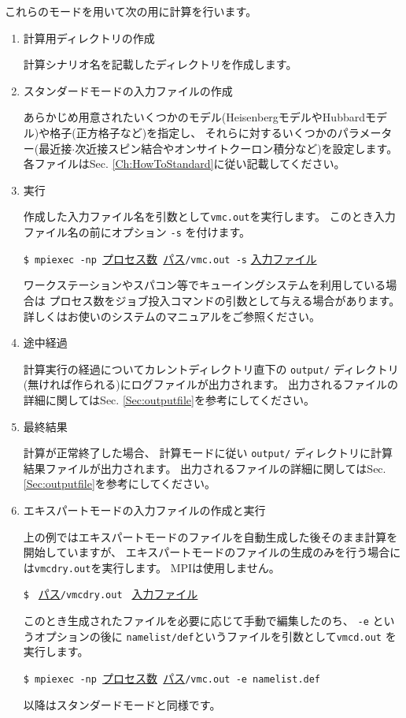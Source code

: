 これらのモードを用いて次の用に計算を行います。

\begin{enumerate}
  
\item  計算用ディレクトリの作成

  計算シナリオ名を記載したディレクトリを作成します。

\item  スタンダードモードの入力ファイルの作成

  あらかじめ用意されたいくつかのモデル(HeisenbergモデルやHubbardモデル)や格子(正方格子など)を指定し、
  それらに対するいくつかのパラメーター(最近接$\cdot$次近接スピン結合やオンサイトクーロン積分など)を設定します。
  各ファイルはSec. \ref{Ch:HowToStandard}に従い記載してください。

\item  実行

  作成した入力ファイル名を引数として\verb|vmc.out|を実行します。
  このとき入力ファイル名の前にオプション \verb|-s| を付けます。
 
  \verb|$ mpiexec -np |\underline{プロセス数}\verb| |\underline{パス}\verb|/vmc.out -s| \underline{入力ファイル} 

  ワークステーションやスパコン等でキューイングシステムを利用している場合は
  プロセス数をジョブ投入コマンドの引数として与える場合があります。
  詳しくはお使いのシステムのマニュアルをご参照ください。

\item 途中経過

  計算実行の経過についてカレントディレクトリ直下の
  \verb|output/| ディレクトリ(無ければ作られる)にログファイルが出力されます。
  出力されるファイルの詳細に関してはSec. \ref{Sec:outputfile}を参考にしてください。

\item 最終結果

  計算が正常終了した場合、
  計算モードに従い \verb|output/| ディレクトリに計算結果ファイルが出力されます。
  出力されるファイルの詳細に関してはSec. \ref{Sec:outputfile}を参考にしてください。

\item エキスパートモードの入力ファイルの作成と実行

  上の例ではエキスパートモードのファイルを自動生成した後そのまま計算を開始していますが、
  エキスパートモードのファイルの生成のみを行う場合には\verb|vmcdry.out|を実行します。
  MPIは使用しません。

  \verb|$ | \underline{パス}\verb|/vmcdry.out | \underline{入力ファイル} 

  このとき生成されたファイルを必要に応じて手動で編集したのち、
  \verb|-e| というオプションの後に \verb|namelist/def|というファイルを引数として\verb|vmcd.out|
  を実行します。
  
  \verb|$ mpiexec -np |\underline{プロセス数}\verb| |\underline{パス}\verb|/vmc.out -e namelist.def|

  以降はスタンダードモードと同様です。

\end{enumerate}

